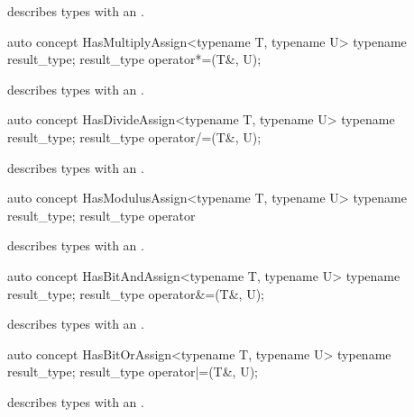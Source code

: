 \documentclass[american,twoside]{book}
\begin{document}
\begin{itemdescr}
\pnum
\mbox{\reallynote} describes types with an \mbox{}.
\end{itemdescr}

\begin{itemdecl}
auto concept HasMultiplyAssign<typename T, typename U> {
  typename result_type;
  result_type operator*=(T&, U);
}
\end{itemdecl}

\begin{itemdescr}
\pnum
\mbox{\reallynote} describes types with an \mbox{}.
\end{itemdescr}

\begin{itemdecl}
auto concept HasDivideAssign<typename T, typename U> {
  typename result_type;
  result_type operator/=(T&, U);
}
\end{itemdecl}

\begin{itemdescr}
\pnum
\mbox{\reallynote} describes types with an \mbox{}.
\end{itemdescr}

\begin{itemdecl}
auto concept HasModulusAssign<typename T, typename U> {
  typename result_type;
  result_type operator%
}
\end{itemdecl}

\begin{itemdescr}
\pnum
\mbox{\reallynote} describes types with an \mbox{}.
\end{itemdescr}

\begin{itemdecl}
auto concept HasBitAndAssign<typename T, typename U> {
  typename result_type;
  result_type operator&=(T&, U);
}
\end{itemdecl}

\begin{itemdescr}
\pnum
\mbox{\reallynote} describes types with an \mbox{}.
\end{itemdescr}

\begin{itemdecl}
auto concept HasBitOrAssign<typename T, typename U> {
  typename result_type;
  result_type operator|=(T&, U);
}
\end{itemdecl}

\begin{itemdescr}
\pnum
\mbox{\reallynote} describes types with an \mbox{}.
\end{itemdescr}
\end{document}
